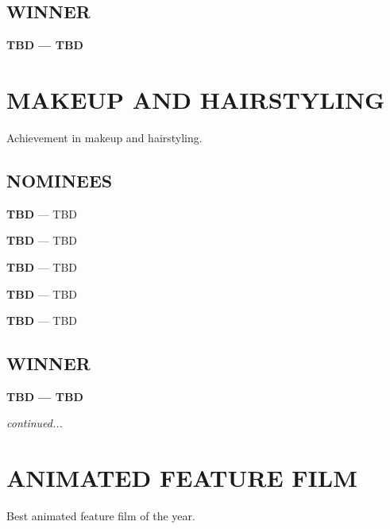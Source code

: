 \documentclass[letterpaper]{extarticle}
\begin{document}
  \subsection*{{\selectfont WINNER}}
  \textcolor{oscaryellow}{\textbf{{\selectfont TBD} — TBD}}

  \section*{\textcolor{oscaryellow}{{\selectfont MAKEUP AND HAIRSTYLING}}}
  \vspace{-6pt}
  {\selectfont Achievement in makeup and hairstyling.}
  \subsection*{{\selectfont NOMINEES}}
  \begin{multicols}{2}
    \begin{itemize}
      \begin{small}
        \item \textbf{{\selectfont TBD}} — TBD
        \item \textbf{{\selectfont TBD}} — TBD
        \item \textbf{{\selectfont TBD}} — TBD
        \item \textbf{{\selectfont TBD}} — TBD
        \item \textbf{{\selectfont TBD}} — TBD
      \end{small}
    \end{itemize}
  \end{multicols}

  \subsection*{{\selectfont WINNER}}
  \textcolor{oscaryellow}{\textbf{{\selectfont TBD} — TBD}}

  \mbox{}
  \vfill
  \textit{continued...}

  \newpage

  \section*{\textcolor{oscaryellow}{{\selectfont ANIMATED FEATURE FILM}}}
  \vspace{-6pt}
  {\selectfont Best animated feature film of the year.}
\end{document}
